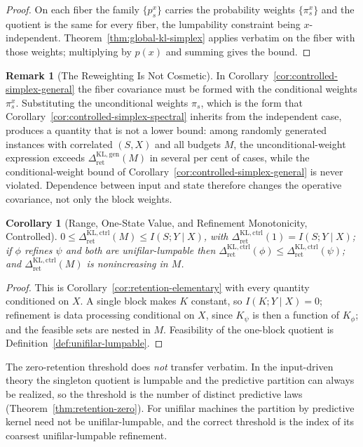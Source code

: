 \documentclass[12pt]{article}
\newtheorem{corollary}[theorem]{Corollary}
\theoremstyle{definition}
\newtheorem{remark}[theorem]{Remark}
\newcommand{\RetKLc}{\Delta_{\mathrm{ret}}^{\mathrm{KL,ctrl}}}
\newcommand{\RetKLg}{\Delta_{\mathrm{ret}}^{\mathrm{KL,gen}}}
\begin{document}
\begin{proof}
On each fiber the family $\{p_s^x\}$ carries the probability weights
$\{\pi_s^x\}$ and the quotient is the same for every fiber, the lumpability
constraint being $x$-independent.  Theorem~\ref{thm:global-kl-simplex} applies
verbatim on the fiber with those weights; multiplying by $p(x)$ and summing
gives the bound.
\end{proof}

\begin{remark}[The Reweighting Is Not Cosmetic]
\label{rem:controlled-general-reweighting}
In Corollary~\ref{cor:controlled-simplex-general} the fiber covariance must be
formed with the conditional weights $\pi_s^x$.  Substituting the unconditional
weights $\pi_s$, which is the form that Corollary~\ref{cor:controlled-simplex-spectral}
inherits from the independent case, produces a quantity that is not a lower
bound: among randomly generated instances with correlated $(S,X)$ and all
budgets $M$, the unconditional-weight expression exceeds $\RetKLg(M)$ in
several per cent of cases, while the conditional-weight bound of
Corollary~\ref{cor:controlled-simplex-general} is never violated.  Dependence
between input and state therefore changes the operative covariance, not only
the block weights.
\end{remark}

\begin{corollary}[Range, One-State Value, and Refinement Monotonicity, Controlled]
\label{cor:controlled-elementary}
$0\le\RetKLc(M)\le I(S;Y\mid X)$, with
$\RetKLc(1)=I(S;Y\mid X)$; if $\phi$ refines $\psi$ and both are
unifilar-lumpable then
$\RetKLc(\phi)\le\RetKLc(\psi)$; and
$\RetKLc(M)$ is nonincreasing in $M$.
\end{corollary}

\begin{proof}
This is Corollary~\ref{cor:retention-elementary} with every quantity
conditioned on $X$.  A single block makes $K$ constant, so $I(K;Y\mid X)=0$;
refinement is data processing conditional on $X$, since $K_\psi$ is then a
function of $K_\phi$; and the feasible sets are nested in $M$.  Feasibility of
the one-block quotient is Definition~\ref{def:unifilar-lumpable}.
\end{proof}

The zero-retention threshold does \emph{not} transfer verbatim.  In the
input-driven theory the singleton quotient is lumpable and the predictive
partition can always be realized, so the threshold is the number of distinct
predictive laws (Theorem~\ref{thm:retention-zero}).  For unifilar machines the
partition by predictive kernel need not be unifilar-lumpable, and the correct
threshold is the index of its coarsest unifilar-lumpable refinement.
\end{document}
